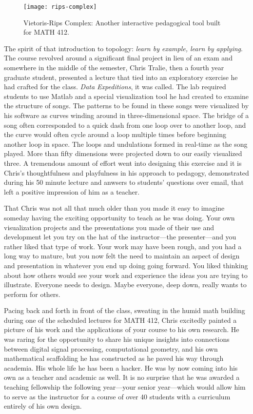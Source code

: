 \documentclass[../main.tex]{subfiles}
\begin{document}
\begin{figure}[h]
	\centering
	\texttt{[image: rips-complex]}
	\caption*{Vietoris-Rips Complex: Another interactive pedagogical tool built for MATH 412.}
\end{figure}

The spirit of that introduction to topology: \textit{learn by example, learn by applying}. The course revolved around a significant final project in lieu of an exam and somewhere in the middle of the semester, Chris Tralie, then a fourth year graduate student, presented a lecture that tied into an exploratory exercise he had crafted for the class. \textit{Data Expeditions}, it was called. The lab required students to use Matlab and a special visualization tool he had created to examine the structure of songs. The patterns to be found in these songs were visualized by his software as curves winding around in three-dimensional space. The bridge of a song often corresponded to a quick dash from one loop over to another loop, and the curve would often cycle around a loop multiple times before beginning another loop in space. The loops and undulations formed in real-time as the song played. More than fifty dimensions were projected down to our easily visualized three. A tremendous amount of effort went into designing this exercise and it is Chris's thoughtfulness and playfulness in his approach to pedagogy, demonstrated during his 50 minute lecture and anwsers to students' questions over email, that left a positive impression of him as a teacher.

That Chris was not all that much older than you made it easy to imagine someday having the exciting opportunity to teach as he was doing. Your own visualization projects and the presentations you made of their use and development let you try on the hat of the instructor---the presenter---and you rather liked that type of work. Your work may have been rough, and you had a long way to mature, but you now felt the need to maintain an aspect of design and presentation in whatever you end up doing going forward. You liked thinking about how others would see your work and experience the ideas you are trying to illustrate. Everyone needs to design. Maybe everyone, deep down, really wants to perform for others.

Pacing back and forth in front of the class, sweating in the humid math building during one of the scheduled lectures for MATH 412, Chris excitedly painted a picture of his work and the applications of your course to his own research. He was raring for the opportunity to share his unique insights into connections between digital signal processing, computational geometry, and his own mathematical scaffolding he has constructed as he paved his way through academia. His whole life he has been a hacker. He was by now coming into his own as a teacher and academic as well. It is no surprise that he was awarded a teaching fellowship the following year---your senior year---which would allow him to serve as the instructor for a course of over 40 students with a curriculum entirely of his own design.
 
\end{document}
